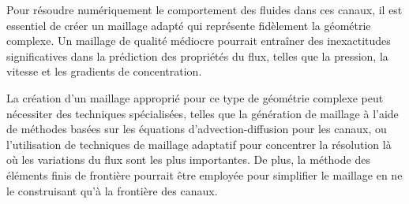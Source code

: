 Pour résoudre numériquement le comportement des fluides dans ces canaux, il est essentiel de créer un maillage adapté qui représente fidèlement la géométrie complexe. Un maillage de qualité médiocre pourrait entraîner des inexactitudes significatives dans la prédiction des propriétés du flux, telles que la pression, la vitesse et les gradients de concentration.

La création d'un maillage approprié pour ce type de géométrie complexe peut nécessiter des techniques spécialisées, telles que la génération de maillage à l'aide de méthodes basées sur les équations d'advection-diffusion pour les canaux, ou l'utilisation de techniques de maillage adaptatif pour concentrer la résolution là où les variations du flux sont les plus importantes. De plus, la méthode des éléments finis de frontière pourrait être employée pour simplifier le maillage en ne le construisant qu'à la frontière des canaux.\\

